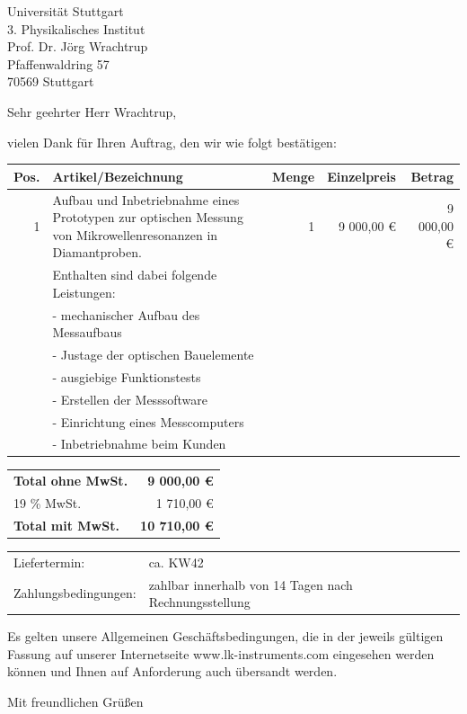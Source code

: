 \documentclass[DIN,
               paper=a4,
               fontsize=11pt,
               enlargefirstpage,
               foldmarks=on,
               pagenumber=off,
               firsthead=on,
               firstfoot=on,
               parskip=full,
               addrfield=on,
               fromalign=right,
               fromemail=true,
               fromphone=true,
               fromurl=true,
               fromlogo=on,
               fromrule=off,
               numericaldate=off,
              ]{scrlttr2}
\begin{document}
\begin{letter}{Universität Stuttgart\\
               3. Physikalisches Institut\\
               Prof. Dr. Jörg Wrachtrup\\               
               Pfaffenwaldring 57\\
               70569 Stuttgart}
               
\opening{Sehr geehrter Herr Wrachtrup,}
vielen Dank für Ihren Auftrag, den wir wie folgt bestätigen:

{\small
\begin{tabular}{|r|p{7.5cm}|r|r|r|}
\hline 
\textbf{Pos.} & \textbf{Artikel/Bezeichnung} & \textbf{Menge} & \textbf{Einzelpreis} & \textbf{Betrag} \\ 
\hline 
1 & Aufbau und Inbetriebnahme eines Prototypen zur optischen Messung
von Mikrowellenresonanzen in Diamantproben. & 1 & 9 000,00 € & 9 000,00 € \\
 & Enthalten sind dabei folgende Leistungen: & & & \\
 & - mechanischer Aufbau des Messaufbaus & & & \\
 & - Justage der optischen Bauelemente & & & \\
 & - ausgiebige Funktionstests & & & \\
 & - Erstellen der Messsoftware & & & \\
 & - Einrichtung eines Messcomputers & & & \\
 & - Inbetriebnahme beim Kunden & & & \\
\hline 
\end{tabular}
} 

\begin{flushright}
\begin{tabular}{l r}
\textbf{Total ohne MwSt.} & \textbf{9 000,00 €}\\
19 \% MwSt. & 1 710,00 €\\
\textbf{Total mit MwSt.} & \textbf{10 710,00 €}
\end{tabular}
\end{flushright}

\begin{tabularx}{\textwidth}{@{}lX}
Liefertermin: & ca. KW42\\
Zahlungsbedingungen: & zahlbar innerhalb von 14 Tagen nach Rechnungsstellung
\end{tabularx}

Es gelten unsere Allgemeinen Geschäftsbedingungen, die in der jeweils gültigen Fassung auf unserer Internetseite www.lk-instruments.com eingesehen werden können und Ihnen auf Anforderung auch übersandt werden.
\closing{Mit freundlichen Grüßen}

\end{letter}
\end{document}

